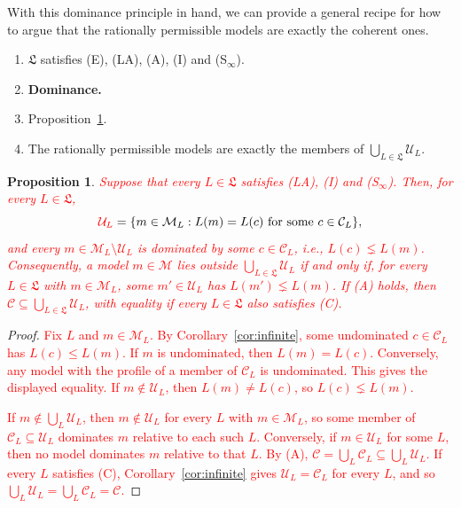 \documentclass[11pt]{article}
\newtheorem{proposition}[theorem]{Proposition}
\theoremstyle{definition}
\theoremstyle{remark}
\newcommand{\M}{\mathcal M}
\newcommand{\C}{\mathcal C}
\newcommand{\U}{\mathcal U}
\begin{document}
With this dominance principle in hand, we can provide a general recipe for how to argue that the rationally permissible models are exactly the coherent ones. 

\begin{enumerate}[label=\textbf{(P\arabic*)},leftmargin=*]
\item $\mathfrak L$ satisfies (E), (LA), (A), (I) and (S$_\infty$).
\item \textbf{Dominance.}
\item Proposition~\ref{prop:permissible}.
\item[\textbf{(C)}] The rationally permissible models are exactly the members of $\bigcup_{L\in\mathfrak L}\U_L$. 

\end{enumerate}

\newpage

\begin{proposition}\label{prop:permissible}
\textcolor{red}{Suppose that every $L\in\mathfrak L$ satisfies (LA), (I) and (S$_\infty$). Then, for every $L\in\mathfrak L$,}
\[
 \textcolor{red}{\U_L}=\{m\in\M_L:L(m)=L(c)\text{ for some }c\in\C_L\},
\]
\textcolor{red}{and every $m\in\M_L\setminus\U_L$ is dominated by some $c\in\C_L$, \textit{i.e.}, $L(c)\lneq L(m)$. Consequently, a model $m\in\M$ lies outside $\bigcup_{L\in\mathfrak L}\U_L$ if and only if, for every $L\in\mathfrak L$ with $m\in\M_L$, some $m'\in\U_L$ has $L(m')\lneq L(m)$. If (A) holds, then $\C\subseteq\bigcup_{L\in\mathfrak L}\U_L$, with equality if every $L\in\mathfrak L$ also satisfies (C).}
\end{proposition}
\begin{proof}
\textcolor{red}{Fix $L$ and $m\in\M_L$. By Corollary~\ref{cor:infinite}, some undominated $c\in\C_L$ has $L(c)\le L(m)$. If $m$ is undominated, then $L(m)=L(c)$. Conversely, any model with the profile of a member of $\C_L$ is undominated. This gives the displayed equality. If $m\notin\U_L$, then $L(m)\ne L(c)$, so $L(c)\lneq L(m)$.}

\textcolor{red}{If $m\notin\bigcup_L\U_L$, then $m\notin\U_L$ for every $L$ with $m\in\M_L$, so some member of $\C_L\subseteq\U_L$ dominates $m$ relative to each such $L$. Conversely, if $m\in\U_L$ for some $L$, then no model dominates $m$ relative to that $L$. By (A), $\C=\bigcup_L\C_L\subseteq\bigcup_L\U_L$. If every $L$ satisfies (C), Corollary~\ref{cor:infinite} gives $\U_L=\C_L$ for every $L$, and so $\bigcup_L\U_L=\bigcup_L\C_L=\C$.}
\end{proof}
\end{document}
